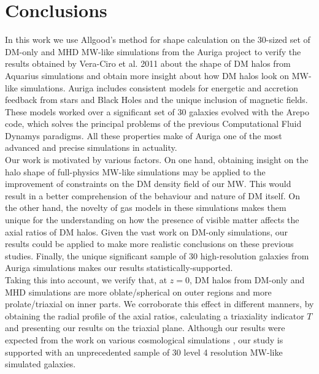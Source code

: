 \chapter{Conclusions}

In this work we use Allgood's method for shape calculation \cite{Allgood_et_al._2006} on the 30-sized set of DM-only and MHD MW-like simulations from the Auriga project to verify the results obtained by Vera-Ciro et al. 2011 about the shape of DM halos from Aquarius simulations and obtain more insight about how DM halos look on MW-like simulations. Auriga includes consistent models for energetic and accretion feedback from stars and Black Holes and the unique inclusion of magnetic fields. These models worked over a significant set of 30 galaxies evolved with the Arepo code, which solves the principal problems of the previous Computational Fluid Dynamys paradigms. All these properties make of Auriga one of the most advanced and precise simulations in actuality.\\ 

Our work is motivated by various factors. On one hand, obtaining insight on the halo shape of full-physics MW-like simulations may be applied to the improvement of constraints on the DM density field of our MW. This would result in a better comprehension of the behaviour and nature of DM itself. On the other hand, the novelty of gas models in these simulations makes them unique for the understanding on how the presence of visible matter affects the axial ratios of DM halos. Given the vast work on DM-only simulations, our results could be applied to make more realistic conclusions on these previous studies. Finally, the unique significant sample of 30 high-resolution galaxies from Auriga simulations makes our results statistically-supported.\\  

Taking this into account, we verify that, at $z=0$, DM halos from DM-only and MHD simulations are more oblate/spherical on outer regions and more prolate/triaxial on inner parts. We corroborate this effect in different manners, by obtaining the radial profile of the axial ratios, calculating a triaxiality indicator $T$ and presenting our results on the triaxial plane. Although our results were expected from the work on various cosmological simulations \cite{Frenk_et_al._1988,Dubinski_and_Carlberg_1991,Warren_et_al._1992,Cole_and_Lacey_1996,Hayashi_et_al._2007,Bett_et_al._2007,Vera-Ciro_et_al._2011}, our study is supported with an unprecedented sample of 30 level 4 resolution MW-like simulated galaxies.\\

